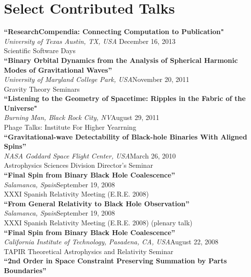 \documentclass[11pt]{seilercv}
\begin{document}
\section{Select Contributed Talks} \vspace{1.0em}
{ {
\textbf{``ResearchCompendia: Connecting Computation to Publication"}\\
\textit{University of Texas Austin, TX, USA} \hfill December 16, 2013 \\
Scientific Software Days \\[2ex]
\textbf{``Binary Orbital Dynamics from the Analysis of Spherical Harmonic Modes of Gravitational Waves''}\\
\textit{University of Maryland College Park, USA}\hfill November 20, 2011 \\
Gravity Theory Seminars  \\[2ex]
\textbf{``Listening to the Geometry of Spacetime: Ripples in the Fabric of the Universe"}\\
\textit{Burning Man, Black Rock City, NV}\hfill August 29, 2011 \\
Phage Talks: Institute For Higher Yearrning \\[2ex]
\textbf{``Gravitational-wave Detectability of Black-hole Binaries With Aligned Spins''}\\
\textit{NASA Goddard Space Flight Center, USA}\hfill March 26, 2010 \\
Astrophysics Sciences Division Director's Seminar  \\ [2ex]
\textbf{``Final Spin from Binary Black Hole Coalescence''}\\
\textit{Salamanca, Spain}\hfill September 19, 2008 \\ 
XXXI Spanish Relativity Meeting (E.R.E. 2008) \\[2ex]
\textbf{``From General Relativity to Black Hole Observation''}\\
\textit{Salamanca, Spain}\hfill September 19, 2008 \\ 
XXXI Spanish Relativity Meeting (E.R.E. 2008) (plenary talk)\\[2ex]
\textbf{``Final Spin from Binary Black Hole Coalescence''}\\
\textit{California Institute of Technology, Pasadena, CA, USA}\hfill August 22, 2008 \\ 
TAPIR Theoretical Astrophysics and Relativity Seminar \\[2ex]
\textbf{``2nd Order in Space Constraint Preserving Summation by Parts Boundaries''}\\
}}
\end{document}
